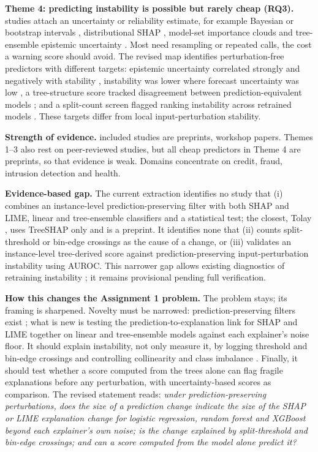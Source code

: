 \textbf{Theme 4: predicting instability is possible but rarely cheap (RQ3).} \mapdiag{} studies attach an uncertainty or reliability estimate, for example Bayesian or bootstrap intervals \cite{S05,S11,S35}, distributional SHAP \cite{S73,S74}, model-set importance clouds \cite{S71} and tree-ensemble epistemic uncertainty \cite{S47}. Most need resampling or repeated calls, the cost a warning score should avoid. The revised map identifies \mapdiagfree{} perturbation-free predictors with different targets: epistemic uncertainty correlated strongly and negatively with stability \cite{S52}, instability was lower where forecast uncertainty was low \cite{S77}, a tree-structure score tracked disagreement between prediction-equivalent models \cite{S75}; and a split-count screen flagged ranking instability across retrained models \cite{S43}. These targets differ from local input-perturbation stability.

\textbf{Strength of evidence.} \incPreprint{} included studies are preprints, \incWorkshop{} workshop papers. Themes 1--3 also rest on peer-reviewed studies, but all \mapdiagfree{} cheap predictors in Theme 4 are preprints, so that evidence is weak. Domains concentrate on credit, fraud, intrusion detection and health.

\textbf{Evidence-based gap.} The current extraction identifies no study that (i) combines an instance-level prediction-preserving filter with both SHAP and LIME, linear and tree-ensemble classifiers and a statistical test; the closest, Tolay \cite{S62}, uses TreeSHAP only and is a preprint. It identifies none that (ii) counts split-threshold or bin-edge crossings as the cause of a change, or (iii) validates an instance-level tree-derived score against prediction-preserving input-perturbation instability using AUROC. This narrower gap allows existing diagnostics of retraining instability \cite{S43}; it remains provisional pending full verification.

\textbf{How this changes the Assignment 1 problem.} The problem stays; its framing is sharpened. Novelty must be narrowed: prediction-preserving filters exist \cite{S09,S25,S62}; what is new is testing the prediction-to-explanation link for SHAP and LIME together on linear and tree-ensemble models against each explainer's noise floor. It should explain instability, not only measure it, by logging threshold and bin-edge crossings and controlling collinearity and class imbalance \cite{S29,S43,S53}. Finally, it should test whether a score computed from the trees alone can flag fragile explanations before any perturbation, with uncertainty-based scores \cite{S52,S77} as comparison. The revised statement reads: \textit{under prediction-preserving perturbations, does the size of a prediction change indicate the size of the SHAP or LIME explanation change for logistic regression, random forest and XGBoost beyond each explainer's own noise; is the change explained by split-threshold and bin-edge crossings; and can a score computed from the model alone predict it?}

